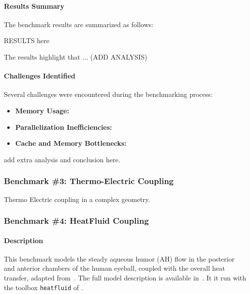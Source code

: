 \paragraph{Results Summary}
The benchmark results are summarized as follows:

RESULTS here

The results highlight that ... (ADD ANALYSIS)

\paragraph{Challenges Identified}
Several challenges were encountered during the benchmarking process:
\begin{itemize}
    \item \textbf{Memory Usage:}
    \item \textbf{Parallelization Inefficiencies:}
    \item \textbf{Cache and Memory Bottlenecks:}
\end{itemize}

add extra analysis  and conclusion here.

\subsubsection{Benchmark \#3: Thermo-Electric Coupling}

Thermo Electric coupling in a complex geometry.








\subsubsection{Benchmark \#4: HeatFluid Coupling}

\newcommand{\vct}[1]{\vec{#1}}
\newcommand{\mat}[1]{\underline{\underline{#1}}}





\paragraph{Description}
This benchmark models the steady aqueous humor (AH) flow in the posterior and anterior chambers of the human eyeball, coupled with the overall heat transfer, adapted from~\cite{ooi_simulation_2008,kilgour_operator_2021}.
The full model description is available in~\cite{saigre_coupled_2024}.
It it run with the toolbox \texttt{heatfluid} of \Feelpp.


